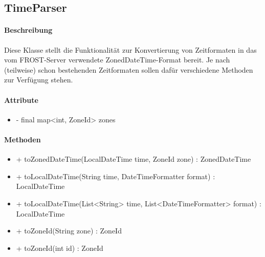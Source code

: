 \subsection{TimeParser}

\paragraph{Beschreibung}
Diese Klasse stellt die Funktionalität zur Konvertierung von Zeitformaten in das vom FROST-Server verwendete ZonedDateTime-Format bereit.
Je nach (teilweise) schon bestehenden Zeitformaten sollen dafür verschiedene Methoden zur Verfügung stehen.

\paragraph{Attribute}
\begin{itemize}
\item - final map<int, ZoneId> zones
\end{itemize}
\paragraph{Methoden}

\begin{itemize}
\item + toZonedDateTime(LocalDateTime time, ZoneId zone) : ZonedDateTime
\item + toLocalDateTime(String time, DateTimeFormatter format) : LocalDateTime
\item + toLocalDateTime(List<String> time, List<DateTimeFormatter> format) : LocalDateTime
\item + toZoneId(String zone) : ZoneId
\item + toZoneId(int id) : ZoneId
\end{itemize}
